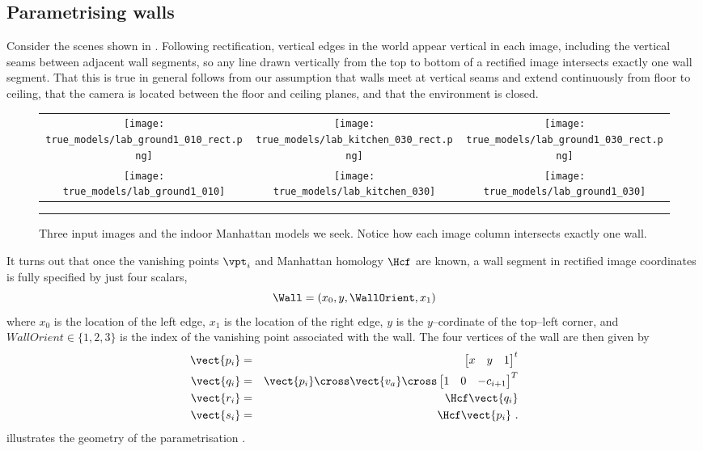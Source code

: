 \subsection{Parametrising walls}

Consider the scenes shown in . Following
rectification, vertical edges in the world appear vertical in each
image, including the vertical seams between adjacent wall segments, so
any line drawn vertically from the top to bottom of a rectified image
intersects exactly one wall segment. That this is true in general
follows from our assumption that walls meet at vertical seams and
extend continuously from floor to ceiling, that the camera is located
between the floor and ceiling planes, and that the environment is
closed.

\begin{figure}[tb]%
  \label{fig:example-scenes}
  \centering
    \begin{tabular}{ccc}
      \texttt{[image: true\_models/lab\_ground1\_010\_rect.png]} &
      \texttt{[image: true\_models/lab\_kitchen\_030\_rect.png]} &
      \texttt{[image: true\_models/lab\_ground1\_030\_rect.png]}
      \\      
      \texttt{[image: true\_models/lab\_ground1\_010]} &
      \texttt{[image: true\_models/lab\_kitchen\_030]} &
      \texttt{[image: true\_models/lab\_ground1\_030]}
    \end{tabular}
  \caption{Three input images and the indoor Manhattan models we
    seek. Notice how each image column intersects exactly one
    wall.}
  \hrule
\end{figure}

It turns out that once the vanishing points $\vpt_i$ and Manhattan
homology $\Hcf$ are known, a wall segment in rectified image
coordinates is fully specified by just four scalars,
\begin{equation}
  \label{eq:wall-def}
  \Wall = ( x_0, y, \WallOrient, x_1 )
\end{equation}
where $x_0$ is the location of the left edge, $x_1$ is the location of
the right edge, $y$ is the $y$--cordinate of the top--left corner, and
$WallOrient\in\{1,2,3\}$ is the index of the vanishing point associated with
the wall. The four vertices of the wall are then given by
\begin{eqnarray}
  \label{eq:pi}
  \vect{p_i} &=& \begin{bmatrix}x&y&1\end{bmatrix}^t \\
  \label{eq:qi}
  \vect{q_i} &=& \vect{p_i}\cross\vect{v_{a}}\cross
               \begin{bmatrix}1&0&-c_{i+1}\end{bmatrix}^T\\
  \label{eq:ri}
  \vect{r_i} &=& \Hcf \vect{q_i}\\
  \label{eq:si}
  \vect{s_i} &=& \Hcf \vect{p_i} ~.
\end{eqnarray}
 illustrates the geometry of the parametrisation
.

